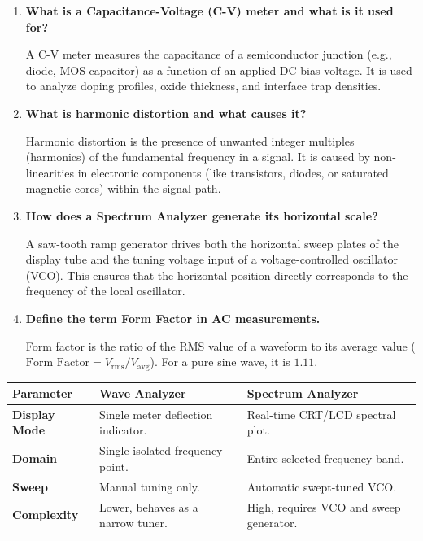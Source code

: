\documentclass[12pt,a4paper]{article}
\newcommand{\Q}[1]{\textbf{#1}\par\noindent\ignorespaces}
\renewcommand{\arraystretch}{1.45}
\begin{document}
\begin{tcolorbox}[exambox, title={\textbf{Frequently Asked / Viva Questions}}]
\begin{enumerate}[topsep=0pt, label=\textbf{Q\arabic*.}, itemsep=5pt]
  \item \Q{What is a Capacitance-Voltage (C-V) meter and what is it used for?}
    A C-V meter measures the capacitance of a semiconductor junction (e.g., diode, MOS capacitor) as a function of an applied DC bias voltage. It is used to analyze doping profiles, oxide thickness, and interface trap densities.
  \item \Q{What is harmonic distortion and what causes it?}
    Harmonic distortion is the presence of unwanted integer multiples (harmonics) of the fundamental frequency in a signal. It is caused by non-linearities in electronic components (like transistors, diodes, or saturated magnetic cores) within the signal path.
  \item \Q{How does a Spectrum Analyzer generate its horizontal scale?}
    A saw-tooth ramp generator drives both the horizontal sweep plates of the display tube and the tuning voltage input of a voltage-controlled oscillator (VCO). This ensures that the horizontal position directly corresponds to the frequency of the local oscillator.
  \item \Q{Define the term Form Factor in AC measurements.}
    Form factor is the ratio of the RMS value of a waveform to its average value ($\text{Form Factor} = V_{\text{rms}} / V_{\text{avg}}$). For a pure sine wave, it is $1.11$.
\end{enumerate}
\end{tcolorbox}

\begin{tcolorbox}[tikzbox, title={Wave Analyzer vs Spectrum Analyzer Comparison}]
\renewcommand{\arraystretch}{1.4}
\par\noindent
\begin{tabularx}{\linewidth}{|B{2.2cm}|>{\small\centering\arraybackslash}X|>{\small\centering\arraybackslash}X|}
\hline
\textbf{Parameter} & \textbf{\color{myred}Wave Analyzer} & \textbf{\color{myteal}Spectrum Analyzer} \\
\hline
\textbf{Display Mode} & Single meter deflection indicator. & Real-time CRT/LCD spectral plot. \\
\hline
\textbf{Domain} & Single isolated frequency point. & Entire selected frequency band. \\
\hline
\textbf{Sweep} & Manual tuning only. & Automatic swept-tuned VCO. \\
\hline
\textbf{Complexity} & Lower, behaves as a narrow tuner. & High, requires VCO and sweep generator. \\
\hline
\end{tabularx}
\end{tcolorbox}
\end{document}
